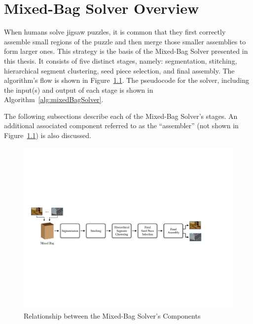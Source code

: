 \chapter{Mixed-Bag Solver Overview}\label{chap:mixedBagSolver}

When humans solve jigsaw puzzles, it is common that they first correctly assemble small regions of the puzzle and then merge those smaller assemblies to form larger ones.  This strategy is the basis of the Mixed-Bag Solver presented in this thesis.  It consists of five distinct stages, namely: segmentation, stitching, hierarchical segment clustering, seed piece selection, and final assembly.  The algorithm's flow is shown in Figure~\ref{fig:multipuzzleSolverArchitecture}.  The pseudocode for the solver, including the input(s) and output of each stage is shown in Algorithm~\ref{alg:mixedBagSolver}. 

The following subsections describe each of the Mixed-Bag Solver's stages.  An additional associated component referred to as the ``assembler'' (not shown in Figure~\ref{fig:multipuzzleSolverArchitecture}) is also discussed.

\begin{figure}[ht!]
	\centering
		\includegraphics[width=1.0\textwidth]{images/cropped_algorithm_structure_overview.pdf}
	\caption{Relationship between the Mixed-Bag Solver's Components}\label{fig:multipuzzleSolverArchitecture}
\end{figure}


